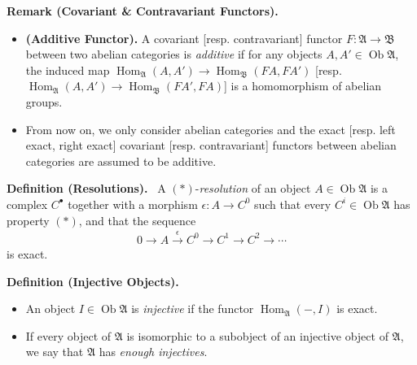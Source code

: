 \documentclass[11pt,a4paper,footinclude=true,headinclude=true]{scrbook} %
\DeclareMathOperator{\Hom}{Hom}
\DeclareMathOperator{\Ob}{Ob}
\newcommand{\Af}{\mathfrak{A}}
\newcommand{\Bf}{\mathfrak{B}}
\newcommand{\<}{\langle}
\newcommand{\>}{\rangle}
\newenvironment{definition}[2][Definition]
    { \begin{mdframed}[backgroundcolor=gray!20] \textbf{#1 #2.}\ }
    {  \end{mdframed}}
\newenvironment{remark}[2][Remark]
    { \begin{mdframed}[backgroundcolor=gray!20] \textbf{#1 #2.} }
    {  \end{mdframed}}
\begin{document}
\begin{remark}{(Covariant \& Contravariant Functors)}\mbox{}
    \begin{itemize}
        \item \textbf{(Additive Functor).} A covariant [resp. contravariant] functor $F:\Af\to\Bf$ between two abelian categories is \textit{additive} if for any objects $A,A'\in\Ob\Af$, the induced map $\Hom_\Af(A,A')\to\Hom_\Bf(FA,FA')$ [resp. $\Hom_\Af(A,A')\to\Hom_\Bf(FA',FA)$] is a homomorphism of abelian groups.
        \item From now on, we only consider abelian categories and the exact [resp. left exact, right exact] covariant [resp. contravariant] functors between abelian categories are assumed to be additive.
    \end{itemize}
\end{remark}

\begin{definition}{(Resolutions)}\newline
    A $(\ast)$-\textit{resolution} of an object $A\in\Ob\Af$ is a complex $C^\bullet$ together with a morphism $\epsilon:A\to C^0$ such that every $C^i\in\Ob\Af$ has property $(\ast)$, and that the sequence
    \begin{align*}
        0\to A\xrightarrow{\epsilon}C^0\to C^1\to C^2\to\cdots
    \end{align*}
    is exact.
\end{definition}

\begin{definition}{(Injective Objects)}
    \begin{itemize}
        \item An object $I\in\Ob\Af$ is \textit{injective} if the functor $\Hom_\Af(-,I)$ is exact.
        \item If every object of $\Af$ is isomorphic to a subobject of an injective object of $\Af$, we say that $\Af$ has \textit{enough injectives}.
    \end{itemize}
\end{definition}
\end{document}
